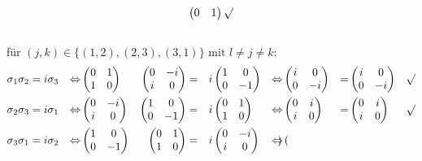\documentclass{HM}
\begin{document}
\begin{enumerate}
$$\begin{pmatrix}
0&1
\end{pmatrix} \surd$$\\
für $(j,k)\in\lbrace(1,2),(2,3),(3,1)\rbrace \text{ mit } l\neq j\neq k$:
\begin{align*}
\sigma_1\sigma_2&=i\sigma_3 &\Leftrightarrow& \begin{pmatrix}
0&1\\
1&0
\end{pmatrix}&\begin{pmatrix}
0&-i\\
i&0
\end{pmatrix}&=&i&\begin{pmatrix}
1&0\\
0&-1
\end{pmatrix}&\Leftrightarrow& \begin{pmatrix}
i&0\\
0&-i
\end{pmatrix}&=&\begin{pmatrix}
i&0\\
0&-i
\end{pmatrix} &\surd\\
\sigma_2\sigma_3&=i\sigma_1 &\Leftrightarrow& \begin{pmatrix}
0&-i\\
i&0
\end{pmatrix}&\begin{pmatrix}
1&0\\
0&-1
\end{pmatrix}&=&i&\begin{pmatrix}
0&1\\
1&0
\end{pmatrix}&\Leftrightarrow& \begin{pmatrix}
0&i\\
i&0
\end{pmatrix}&=&\begin{pmatrix}
0&i\\
i&0
\end{pmatrix} &\surd\\
\sigma_3\sigma_1&=i\sigma_2 &\Leftrightarrow& \begin{pmatrix}
1&0\\
0&-1
\end{pmatrix}&\begin{pmatrix}
0&1\\
1&0
\end{pmatrix}&=&i&\begin{pmatrix}
0&-i\\
i&0
\end{pmatrix}&\Leftrightarrow& \begin{pmatrix}

\end{pmatrix}
\end{align*}
\end{enumerate}
\end{document}
